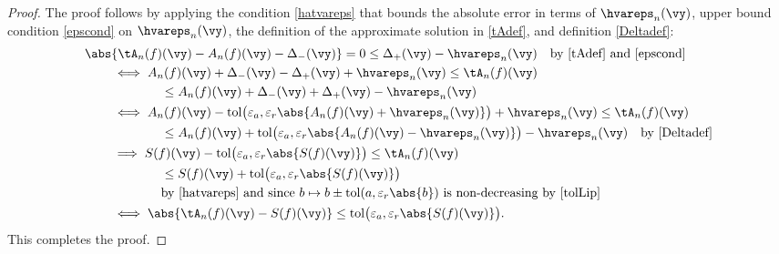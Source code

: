 \documentclass[]{elsarticle}
\DeclareMathOperator{\tol}{tol}
\theoremstyle{definition}
\theoremstyle{remark}
\begin{document}
\begin{proof} The proof follows by applying the condition \eqref{hatvareps} that bounds the absolute error in terms of $\hvareps_n(\vy)$, upper bound condition \eqref{epscond} on $\hvareps_n(\vy)$, the definition of the approximate solution in \eqref{tAdef}, and definition \eqref{Deltadef}:
\begin{align*}
\MoveEqLeft{\abs{\tA_n(f)(\vy) - A_n(f)(\vy) - \Delta_-(\vy)}= 0  \le \Delta_+(\vy) - \hvareps_n(\vy)} \quad \text{by \eqref{tAdef} and \eqref{epscond}}\\
& \iff A_n(f)(\vy) + \Delta_-(\vy) - \Delta_+(\vy) + \hvareps_n(\vy) \le  \tA_n(f)(\vy) \\
& \qquad \qquad  \le A_n(f)(\vy) + \Delta_-(\vy) + \Delta_+(\vy) - \hvareps_n(\vy)\\
& \iff A_n(f)(\vy) - \tol\bigl(\varepsilon_a, \varepsilon_r \abs{A_n(f)(\vy)+\hvareps_n(\vy)}\bigr) + \hvareps_n(\vy) \le  \tA_n(f)(\vy) \\
& \qquad \qquad  \le A_n(f)(\vy) + \tol\bigl(\varepsilon_a, \varepsilon_r \abs{A_n(f)(\vy)-\hvareps_n(\vy)}\bigr) - \hvareps_n(\vy) \quad\text{by \eqref{Deltadef}}\\
& \implies S(f)(\vy) - \tol\bigl(\varepsilon_a, \varepsilon_r\abs{S(f)(\vy)}\bigr) \le  \tA_n(f)(\vy) \\
& \qquad \qquad  \le S(f)(\vy) + \tol\bigl(\varepsilon_a, \varepsilon_r \abs{S(f)(\vy)}\bigr) \\
& \qquad \qquad \text{by \eqref{hatvareps} and since  $b \mapsto b\pm\tol(a,\varepsilon_r\abs{b})$ is non-decreasing by \eqref{tolLip}}\\
& \iff  \abs{\tA_n(f)(\vy) - S(f)(\vy)} \le \tol\bigl(\varepsilon_a, \varepsilon_r \abs{S(f)(\vy)}\bigr).
\end{align*}
This completes the proof.
\end{proof}
\end{document}
